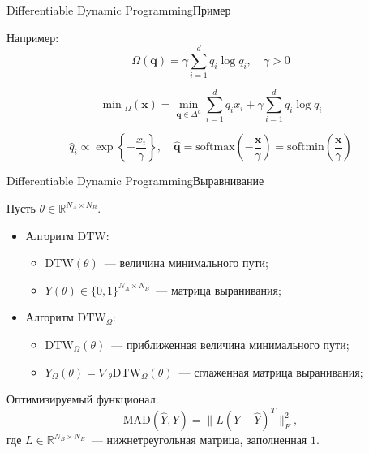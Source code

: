 \documentclass[unicode, dvipsnames]{beamer}
\begin{document}
\begin{frame}{Differentiable Dynamic Programming}{Пример}

Например:
\[
	\Omega(\bm{q}) = \gamma \sum_{i=1}^d q_i \log q_i, \quad \gamma > 0
\]

\[
\min{}_{\Omega}(\bm{x}) = \min\limits_{\bm{q} \in \Delta^d} \sum_{i=1}^d q_i x_i + \gamma \sum_{i=1}^d q_i \log q_i 
\]

\[
	\hat q_i \propto \exp\left\{-\frac{x_i}{\gamma}\right\}, \quad \hat{\bm{q}} = \mathrm{softmax}\left(-\frac{\bm{x}}{\gamma}\right)= \mathrm{softmin}\left(\frac{\bm{x}}{\gamma}\right)
\]
	
\end{frame}

\begin{frame}{Differentiable Dynamic Programming}{Выравнивание}
	
Пусть $\theta \in \mathbb{R}^{N_A \times N_B}$. 

\begin{itemize}
	\item Алгоритм $\mathrm{DTW}$:
	\begin{itemize}
		\item $\mathrm{DTW}(\theta)$~--- величина минимального пути;
		\item $Y(\theta) \in \{0, 1\}^{N_A \times N_B}$~--- матрица выранивания;
	\end{itemize}
	\item Алгоритм  $\mathrm{DTW}_\Omega$:
	\begin{itemize}
		\item $\mathrm{DTW}_\Omega(\theta)$~--- приближенная величина минимального пути;
		\item $Y_\Omega(\theta) = \nabla_\theta \mathrm{DTW}_\Omega(\theta)$~--- сглаженная матрица выранивания;
	\end{itemize}
\end{itemize}	
	Оптимизируемый функционал:
	\[
	\mathrm{MAD}(\hat Y, Y) = \|L(Y - \hat Y)^T\|^2_F,
	\]
	где $L \in \mathbb{R}^{N_B \times N_B}$~--- нижнетреугольная матрица, заполненная $1$.
\end{frame}
\end{document}
